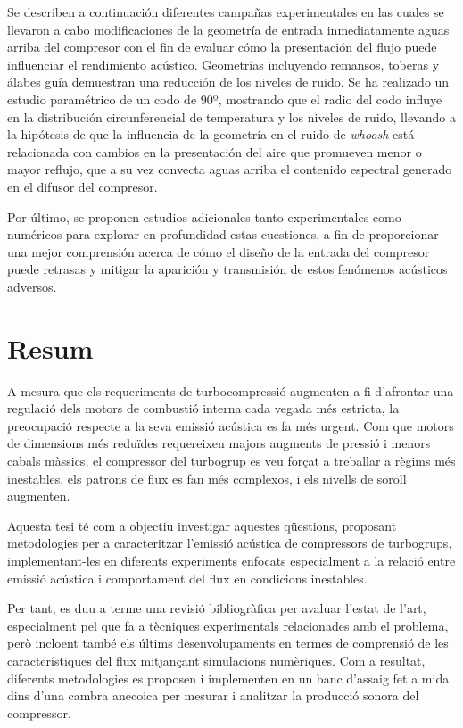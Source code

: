 Se describen a continuación diferentes campañas experimentales en las cuales se llevaron a cabo modificaciones de la geometría de entrada inmediatamente aguas arriba del compresor con el fin de evaluar cómo la presentación del flujo puede influenciar el rendimiento acústico. Geometrías incluyendo remansos, toberas y álabes guía demuestran una reducción de los niveles de ruido. Se ha realizado un estudio paramétrico de un codo de 90º, mostrando que el radio del codo influye en la distribución circunferencial de temperatura y los niveles de ruido, llevando a la hipótesis de que la influencia de la geometría en el ruido de \emph{whoosh} está relacionada con cambios en la presentación del aire que promueven menor o mayor reflujo, que a su vez convecta aguas arriba el contenido espectral generado en el difusor del compresor.

Por último, se proponen estudios adicionales tanto experimentales como numéricos para explorar en profundidad estas cuestiones, a fin de proporcionar una mejor comprensión acerca de cómo el diseño de la entrada del compresor puede retrasas y mitigar la aparición y transmisión de estos fenómenos acústicos adversos.

\cleardoublepage

\chapter*{Resum}

A mesura que els requeriments de turbocompressió augmenten a fi d'afrontar una regulació dels motors de combustió interna cada vegada més estricta, la preocupació respecte a la seva emissió acústica es fa més urgent. Com que motors de dimensions més reduïdes requereixen majors augments de pressió i menors cabals màssics, el compressor del turbogrup es veu forçat a treballar a règims més inestables, els patrons de flux es fan més complexos, i els nivells de soroll augmenten.

Aquesta tesi té com a objectiu investigar aquestes qüestions, proposant metodologies per a caracteritzar l'emissió acústica de compressors de turbogrups, implementant-les en diferents experiments enfocats especialment a la relació entre emissió acústica i comportament del flux en condicions inestables.

Per tant, es duu a terme una revisió bibliogràfica per avaluar l'estat de l'art, especialment pel que fa a tècniques experimentals relacionades amb el problema, però incloent també els últims desenvolupaments en termes de comprensió de les característiques del flux mitjançant simulacions numèriques. Com a resultat, diferents metodologies es proposen i implementen en un banc d'assaig fet a mida dins d'una cambra anecoica per mesurar i analitzar la producció sonora del compressor.

